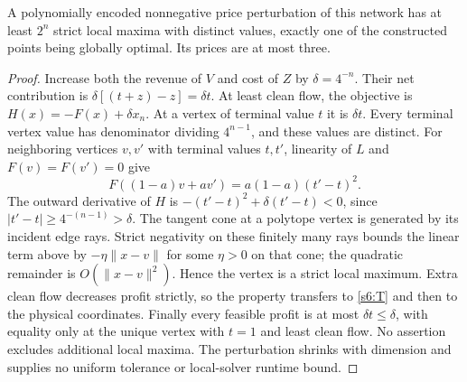 \begin{corollary}\label{s6:local}
A polynomially encoded nonnegative price perturbation of this network
has at least $2^n$ strict local maxima with distinct values, exactly one
of the constructed points being globally optimal. Its prices are at
most three.
\end{corollary}
\begin{proof}
Increase both the revenue of $V$ and cost of $Z$ by $\delta=4^{-n}$.
Their net contribution is $\delta[(t+z)-z]=\delta t$.
At least clean flow, the objective is $H(x)=-F(x)+\delta x_n$.
At a vertex of terminal value $t$ it is $\delta t$. Every terminal
vertex value has denominator dividing $4^{n-1}$, and these values are
distinct. For neighboring vertices $v,v'$ with terminal values $t,t'$,
linearity of $L$ and $F(v)=F(v')=0$ give
\[
 F((1-a)v+av')=a(1-a)(t'-t)^2.
\]
The outward derivative of $H$ is
$-(t'-t)^2+\delta(t'-t)<0$, since $|t'-t|\ge4^{-(n-1)}>\delta$.
The tangent cone at a polytope vertex is generated by its incident edge
rays. Strict negativity on these finitely many rays bounds the linear
term above by $-\eta\|x-v\|$ for some $\eta>0$ on that cone; the
quadratic remainder is $O(\|x-v\|^2)$. Hence the vertex is a strict
local maximum. Extra clean flow decreases profit strictly, so the
property transfers to \eqref{s6:T} and then to the physical coordinates.
Finally every feasible profit is at most $\delta t\le\delta$, with
equality only at the unique vertex with $t=1$ and least clean flow.
No assertion excludes additional local maxima. The perturbation shrinks
with dimension and supplies no uniform tolerance or local-solver runtime
bound.
\end{proof}

